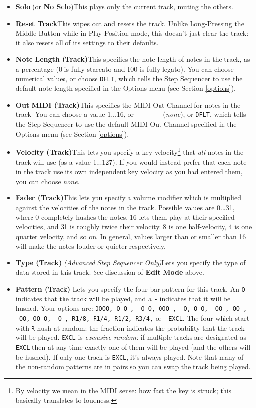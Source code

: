 \documentclass{article}
\begin{document}
\begin{itemize}
\item {\bf Solo} (or {\bf No Solo})\quad This plays only the current track, muting the others.
\item {\bf Reset Track}\quad This wipes out and resets the track.  Unlike Long-Pressing the Middle Button while in Play Position mode, this doesn't just clear the track: it also resets all of its settings to their defaults.
\item {\bf Note Length (Track)}\quad This specifies the note length of notes in the track, as a percentage (0 is fully staccato and 100 is fully legato).   You can choose numerical values, or choose \texttt{DFLT}, which tells the Step Sequencer to use the default note length specified in the Options menu (see Section \ref{options}).
\item {\bf Out MIDI (Track)}\quad This specifies the MIDI Out Channel for notes in the track,    You can choose a value 1...16, or \texttt{- - - -} ({\it none}), or \texttt{DFLT}, which tells the Step Sequencer to use the default MIDI Out Channel specified in the Options menu (see Section \ref{options}).
\item {\bf Velocity (Track)}\quad This lets you specify a key velocity\footnote{By velocity we mean in the MIDI sense: how fast the key is struck; this basically translates to loudness.} that {\it all} notes in the track will use (as a value 1...127).  If you would instead prefer that each note in the track use its own independent key velocity as you had entered them, you can choose {\it none}.
\item {\bf Fader (Track)}\quad This lets you specify a volume modifier which is multiplied against the velocities of the notes in the track.  Possible values are 0...31, where 0 completely hushes the notes, 16 lets them play at their specified velocities, and 31 is roughly twice their velocity.  8 is one half-velocity, 4 is one quarter velocity, and so on.  In general, values larger than or smaller than 16 will make the notes louder or quieter respectively.
\item {\bf Type (Track)} {\it (Advanced Step Sequencer Only)}\quad Lets you specify the type of data stored in this track.  See discussion of {\bf Edit Mode} above.
\item {\bf Pattern (Track)} \quad Lets you specify the four-bar pattern for this track.  An {\tt O} indicates that the track will be played, and a {\tt -} indicates that it will be hushed.  Your options are: \texttt{OOOO, O-O-, -O-O, OOO-, ---O, O--O, -OO-, OO--, --OO, OO-O, --O-, R1/8, R1/4, R1/2, R3/4,} or\ \ {\tt EXCL}.  The four which start with {\tt R} hush at random: the fraction indicates the probability that the track will be played.  {\tt EXCL} is {\it exclusive random:} if multiple tracks are designated as {\tt EXCL} then at any time exactly one of them will be played (and the others will be hushed).  If only one track is {\tt EXCL}, it's always played.  Note that many of the non-random patterns are in pairs so you can swap the track being played.

\end{itemize}
\end{document}
